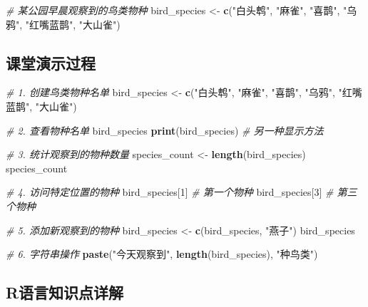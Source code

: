 \documentclass[
]{book}
\newenvironment{Shaded}{\begin{snugshade}}{\end{snugshade}}
\newcommand{\CommentTok}[1]{\textcolor[rgb]{0.56,0.35,0.01}{\textit{#1}}}
\newcommand{\DecValTok}[1]{\textcolor[rgb]{0.00,0.00,0.81}{#1}}
\newcommand{\FunctionTok}[1]{\textcolor[rgb]{0.13,0.29,0.53}{\textbf{#1}}}
\newcommand{\NormalTok}[1]{#1}
\newcommand{\OtherTok}[1]{\textcolor[rgb]{0.56,0.35,0.01}{#1}}
\newcommand{\StringTok}[1]{\textcolor[rgb]{0.31,0.60,0.02}{#1}}
\begin{document}
\begin{Shaded}
\begin{Highlighting}[]
\CommentTok{\# 某公园早晨观察到的鸟类物种}
\NormalTok{bird\_species }\OtherTok{\textless{}{-}} \FunctionTok{c}\NormalTok{(}\StringTok{"白头鹎"}\NormalTok{, }\StringTok{"麻雀"}\NormalTok{, }\StringTok{"喜鹊"}\NormalTok{, }\StringTok{"乌鸦"}\NormalTok{, }\StringTok{"红嘴蓝鹊"}\NormalTok{, }\StringTok{"大山雀"}\NormalTok{)}
\end{Highlighting}
\end{Shaded}

\hypertarget{ux8bfeux5802ux6f14ux793aux8fc7ux7a0b-1}{%
\subsection{课堂演示过程}\label{ux8bfeux5802ux6f14ux793aux8fc7ux7a0b-1}}

\begin{Shaded}
\begin{Highlighting}[]
\CommentTok{\# 1. 创建鸟类物种名单}
\NormalTok{bird\_species }\OtherTok{\textless{}{-}} \FunctionTok{c}\NormalTok{(}\StringTok{"白头鹎"}\NormalTok{, }\StringTok{"麻雀"}\NormalTok{, }\StringTok{"喜鹊"}\NormalTok{, }\StringTok{"乌鸦"}\NormalTok{, }\StringTok{"红嘴蓝鹊"}\NormalTok{, }\StringTok{"大山雀"}\NormalTok{)}

\CommentTok{\# 2. 查看物种名单}
\NormalTok{bird\_species}
\FunctionTok{print}\NormalTok{(bird\_species)  }\CommentTok{\# 另一种显示方法}

\CommentTok{\# 3. 统计观察到的物种数量}
\NormalTok{species\_count }\OtherTok{\textless{}{-}} \FunctionTok{length}\NormalTok{(bird\_species)}
\NormalTok{species\_count}

\CommentTok{\# 4. 访问特定位置的物种}
\NormalTok{bird\_species[}\DecValTok{1}\NormalTok{]  }\CommentTok{\# 第一个物种}
\NormalTok{bird\_species[}\DecValTok{3}\NormalTok{]  }\CommentTok{\# 第三个物种}

\CommentTok{\# 5. 添加新观察到的物种}
\NormalTok{bird\_species }\OtherTok{\textless{}{-}} \FunctionTok{c}\NormalTok{(bird\_species, }\StringTok{"燕子"}\NormalTok{)}
\NormalTok{bird\_species}

\CommentTok{\# 6. 字符串操作}
\FunctionTok{paste}\NormalTok{(}\StringTok{"今天观察到"}\NormalTok{, }\FunctionTok{length}\NormalTok{(bird\_species), }\StringTok{"种鸟类"}\NormalTok{)}
\end{Highlighting}
\end{Shaded}

\hypertarget{rux8bedux8a00ux77e5ux8bc6ux70b9ux8be6ux89e3-1}{%
\subsection{R语言知识点详解}\label{rux8bedux8a00ux77e5ux8bc6ux70b9ux8be6ux89e3-1}}
\end{document}
